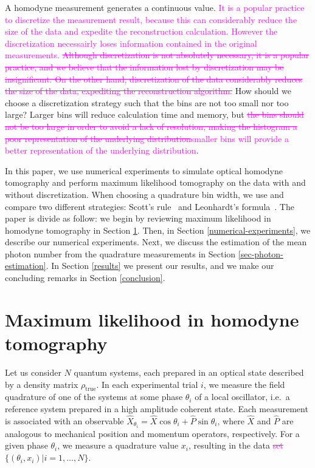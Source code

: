 \documentclass[
reprint,
superscriptaddress,
showpacs,
amsmath,
amssymb,
aps,
pra,
longbibliography
]{revtex4-1}
\providecommand{\aucmnt}[1]{#1}
\providecommand{\editcolor}[2]{\textcolor{#1}{#2}}
\providecommand{\aucmnt}[1]{}
\providecommand{\editcolor}[2]{#2}
\newcommand{\SG}[1]{\editcolor{magenta}{#1}}
\newcommand{\SGs}[1]{\aucmnt{\editcolor{magenta}{\sout{#1}}}}
\newcommand{\rhotrue}{\rho_{\text{true}}}
\begin{document}
A homodyne measurement generates a continuous value.  \SG{It is a
  popular practice to discretize the measurement result, because this
  can considerably reduce the size of the data and expedite the
  reconstruction calculation.  However the discretization necessairly
  loses information contained in the original measurements.}
\SGs{Although discretization is not absolutely necessary, it is a
  popular practice, and we believe that the information lost by
  discretization may be insignificant. On the other hand,
  discretization of the data considerably reduces the size of the
  data, expediting the reconstruction algorithm.} How should we choose
a discretization strategy such that the bins are not too small nor too
large? Larger bins will reduce calculation time and memory, but
\SGs{the bins should not be too large in order to avoid a lack of
  resolution, making the histogram a poor representation of the
  underlying distribution}\SG{smaller bins will provide a better
  representation of the underlying distribution}.
 
In this paper, we use numerical experiments to simulate optical
homodyne tomography and perform maximum likelihood tomography on the
data with and without discretization. When choosing a quadrature bin
width, we use and compare two different strategies: Scott's
rule~\cite{Scott2010} and Leonhardt's formula~\cite{Leonhardt1996}.
The paper is divide as follow: we begin by reviewing maximum
likelihood in homodyne tomography in Section \ref{MLE}. Then, in
Section \ref{numerical-experiments}, we describe our numerical
experiments. Next, we discuss the estimation of the mean photon number
from the quadrature measurements in Section
\ref{sec-photon-estimation}. In Section \ref{results} we present our
results, and we make our concluding remarks in Section
\ref{conclusion}.

\section{Maximum likelihood in homodyne tomography}
\label{MLE}
Let us consider $N$ quantum systems, each prepared in an optical state
described by a density matrix $\rhotrue$. In each experimental trial
$i$, we measure the field quadrature of one of the systems at some
phase $\theta_i$ of a local oscillator, i.e.\ a reference system
prepared in a high amplitude coherent state.  Each measurement is
associated with an observable
$\hat{X}_{\theta_i} = \hat{X} \cos \theta_i + \hat{P} \sin \theta_i$,
where $\hat{X}$ and $\hat{P}$ are analogous to mechanical position and
momentum operators, respectively. For a given phase $\theta_i$, we
measure a quadrature value $x_i$, resulting in the data\SGs{ set}
$\{(\theta_i, x_i)| i = 1, \ldots, N\}$.
\end{document}
